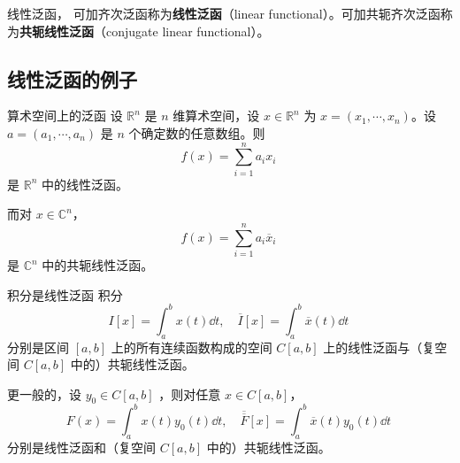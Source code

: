 \begin{definition}{线性泛函，}
可加齐次泛函称为\textbf{线性泛函}（linear functional）。可加共轭齐次泛函称为\textbf{共轭线性泛函}（conjugate linear functional）。
\end{definition}


\subsection{线性泛函的例子}

\begin{example}{算术空间上的泛函}
设 $\mathbb R^n$ 是 $n$ 维算术空间，设 $x\in\mathbb R^n$ 为 $x=(x_1,\cdots,x_n)$。设 $a=(a_1,\cdots,a_n)$ 是 $n$ 个确定数的任意数组。则
\begin{equation}
f(x)=\sum_{i=1}^n a_ix_i~
\end{equation}
是 $\mathbb R^n$ 中的线性泛函。

而对 $x\in\mathbb C^n$，
\begin{equation}
f(x)=\sum_{i=1}^n a_i\overline x_i~
\end{equation}
是  $\mathbb C^n$ 中的共轭线性泛函。

\end{example}


\begin{example}{积分是线性泛函}
积分
\begin{equation}
I[x]=\int_a^b x(t)\dd t,\quad \overline I[x]=\int_a^b \overline x(t)\dd t~
\end{equation}
分别是区间 $[a,b]$ 上的所有连续函数构成的空间 $C[a,b]$ 上的线性泛函与（复空间 $C[a,b]$ 中的）共轭线性泛函。
\end{example}

\begin{example}{}
更一般的，设 $y_0\in C[a,b]$ ，则对任意 $x\in C[a,b]$，
\begin{equation}
F(x)=\int_a^b x(t)y_0(t)\dd t,\quad \overline \overline F[x]=\int_a^b \overline x(t)y_0(t)\dd t~
\end{equation}
分别是线性泛函和（复空间 $C[a,b]$ 中的）共轭线性泛函。
\end{example}






